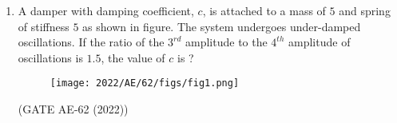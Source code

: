 \begin{enumerate}[label=\thechapter.\arabic*,ref=\thechapter.\theenumi]
\item A damper with damping coefficient, $c$, is attached to a mass of $5$  and spring of stiffness  $5$  as shown in figure. The system undergoes under-damped oscillations.
If the ratio of the $3^{rd}$ amplitude to the $4^{th}$ amplitude of oscillations is ${1.5}$, the value of $c$ is ?
\begin{figure}[ht]
    \centering
    \texttt{[image: 2022/AE/62/figs/fig1.png]}
\end{figure}

\hfill {(GATE AE-62 (2022))}
\solution
\newpage

\end{enumerate}
